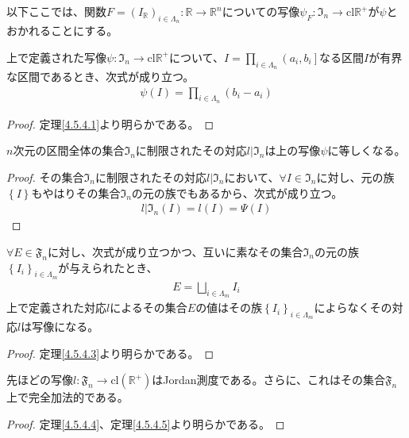\documentclass[dvipdfmx]{jsarticle}
\begin{document}
以下ここでは、関数$F = \left( I_{\mathbb{R}} \right)_{i \in \varLambda_{n}}:\mathbb{R} \rightarrow \mathbb{R}^{n}$についての写像$\psi_{F}:\mathfrak{I}_{n} \rightarrow \mathrm{cl}\mathbb{R}^{+}$が$\psi$とおかれることにする。
\begin{thm}\label{4.6.5.1}
上で定義された写像$\psi:\mathfrak{I}_{n} \rightarrow \mathrm{cl}\mathbb{R}^{+}$について、$I = \prod_{i \in \varLambda_{n}} \left( a_{i},b_{i} \right]$なる区間$I$が有界な区間であるとき、次式が成り立つ。
\begin{align*}
\psi(I) = \prod_{i \in \varLambda_{n}} \left( b_{i} - a_{i} \right)
\end{align*}
\end{thm}
\begin{proof} 定理\ref{4.5.4.1}より明らかである。
\end{proof}
\begin{thm}\label{4.6.5.2}
$n$次元の区間全体の集合$\mathfrak{I}_{n}$に制限されたその対応$l|\mathfrak{I}_{n}$は上の写像$\psi$に等しくなる。
\end{thm}
\begin{proof}
その集合$\mathfrak{I}_{n}$に制限されたその対応$l|\mathfrak{I}_{n}$において、$\forall I \in \mathfrak{I}_{n}$に対し、元の族$\left\{ I \right\}$もやはりその集合$\mathfrak{I}_{n}$の元の族でもあるから、次式が成り立つ。
\begin{align*}
l|\mathfrak{I}_{n}(I) = l(I) = \varPsi(I)
\end{align*}
\end{proof}
\begin{thm}\label{4.6.5.3}
$\forall E \in \mathfrak{F}_{n}$に対し、次式が成り立つかつ、互いに素なその集合$\mathfrak{I}_{n}$の元の族$\left\{ I_{i} \right\}_{i \in \varLambda_{m}}$が与えられたとき、
\begin{align*}
E = \bigsqcup_{i \in \varLambda_{m}} I_{i}
\end{align*}
上で定義された対応$l$によるその集合$E$の値はその族$\left\{ I_{i} \right\}_{i \in \varLambda_{m}}$によらなくその対応$l$は写像になる。
\end{thm}
\begin{proof} 定理\ref{4.5.4.3}より明らかである。
\end{proof}
\begin{thm}\label{4.6.5.4}
先ほどの写像$l:\mathfrak{F}_{n} \rightarrow \mathrm{cl}\left( \mathbb{R}^{+} \right)$はJordan測度である。さらに、これはその集合$\mathfrak{F}_{n}$上で完全加法的である。
\end{thm}
\begin{proof} 定理\ref{4.5.4.4}、定理\ref{4.5.4.5}より明らかである。
\end{proof}
\end{document}

